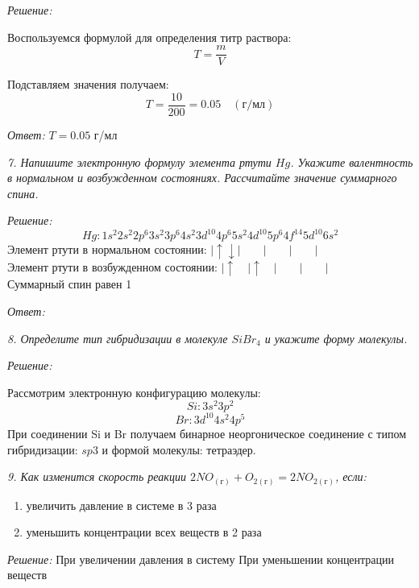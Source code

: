\emph{Решение:}

Воспользуемся формулой для определения титр раствора:
\[
	T = \frac{m}{V}
\]

Подставляем значения получаем:
\[
	T = \frac{10}{200} = 0.05 \quad(\text{г/мл})
\]

\emph{Ответ: } \( T = 0.05 \) г/мл

\pagebreak

\emph{7. Напишите электронную формулу элемента ртути \( Hg \). Укажите 
валентность в нормальном и возбужденном состояниях. Рассчитайте значение 
суммарного спина.}

\emph{Решение:}
\[
	Hg: 1s^2 2s^2 2p^6 3s^2 3p^6 4s^2 3d^{10} 4p^6 5s^2 4d^{10} 5p^6
        4f^{14} 5d^{10} 6s^2
\]
Элемент ртути в нормальном состоянии: 
\(
	\vert\uparrow\downarrow\vert\quad\quad\vert\quad\quad\vert\quad\quad\vert
\) \\
Элемент ртути в возбужденном состоянии:
\(
	\vert\uparrow\quad\vert\uparrow\quad\vert\quad\quad\vert\quad\quad\vert
\) \\
Суммарный спин равен 1

\emph{Ответ: }

\pagebreak

\emph{8. Определите тип гибридизации в молекуле \( SiBr_4 \) и укажите 
форму молекулы.}

\emph{Решение:}

Рассмотрим электронную конфигурацию молекулы:
\[ Si: 3s^2 3p^2 \]
\[ Br: 3d^10 4s^2 4p^5 \]
При соединении Si и Br получаем бинарное неоргоническое соединение с 
типом гибридизации: \( sp3 \) и формой молекулы: тетраэдер.

\pagebreak

\emph{9. Как изменится скорость реакции 
\( 2NO_{(\text{г})} + O_{2(\text{г})} = 2NO_{2(\text{г})} \), если:}
\begin{enumerate}
    \item увеличить давление в системе в 3 раза
    \item уменьшить концентрации всех веществ в 2 раза
\end{enumerate}

\emph{Решение:}
При увеличении давления в систему 
При уменьшении концентрации веществ

\pagebreak

